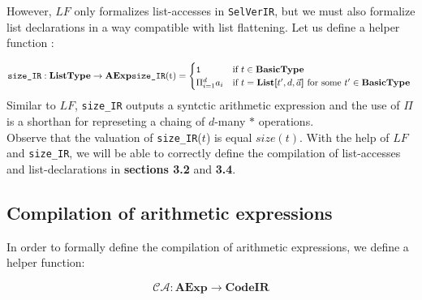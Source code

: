 \documentclass{article}
\begin{document}
However, $\mathit{LF}$ only formalizes list-accesses in \texttt{SelVerIR}, but we must also formalize list declarations in a way compatible with list flattening. Let us define a helper function :

\[
\texttt{size\_IR} : \textbf{ListType} \rightarrow \textbf{AExp} \\

\texttt{size\_IR}($t$) = \begin{cases}
    \texttt{1} & \text{if $t \in \textbf{BasicType}$ } \\
    \Pi_{i=1}^d{a_i} & \text{if $t = \textbf{List[$t', d, \vec{a}$]}$ for some $t' \in \textbf{BasicType}$ }
\end{cases}
\] Similar to $\mathit{LF}$, \texttt{size\_IR} outputs a syntctic arithmetic expression and the use of $\Pi$ is a shorthan for represeting a chaing of $d$-many $\ast$ operations. \\

Observe that the valuation of \texttt{size\_IR}($t$) is equal $size(t)$. With the help of $\mathit{LF}$ and \texttt{size\_IR}, we will be able to correctly define the compilation of list-accesses and list-declarations in \textbf{sections 3.2} and \textbf{3.4}.


\newpage
\subsection{Compilation of arithmetic expressions}

In order to formally define the compilation of arithmetic expressions, we define a helper function:

\[
\mathcal{CA}: \textbf{AExp} \rightarrow \textbf{CodeIR}
\]
\end{document}
